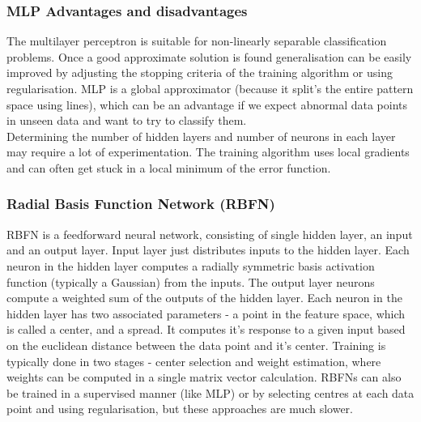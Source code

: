 \documentclass[a4paper, 11pt]{article}
\begin{document}
\subsubsection{MLP Advantages and disadvantages}
The multilayer perceptron is suitable for non-linearly separable classification problems. Once a good approximate solution is found generalisation can be easily improved by adjusting the stopping criteria of the training algorithm or using regularisation. MLP is a global approximator (because it split's the entire pattern space using lines), which can be an advantage if we expect abnormal data points in unseen data and want to try to classify them. \\ 
Determining the number of hidden layers and number of neurons in each layer may require a lot of experimentation. The training algorithm uses local gradients and can often get stuck in a local minimum of the error function. 


\subsubsection{Radial Basis Function Network (RBFN)}
RBFN is a feedforward neural network, consisting of single hidden layer, an input and an output layer. Input layer just distributes inputs to the hidden layer. Each neuron in the hidden layer computes a radially symmetric basis activation function (typically a Gaussian) from the inputs. The output layer neurons compute a weighted sum of the outputs of the hidden layer. Each neuron in the hidden layer has two associated parameters - a point in the feature space, which is called a center, and a spread. It computes it's response to a given input based on the euclidean distance between the data point and it's center. Training is typically done in two stages - center selection and weight estimation, where weights can be computed in a single matrix vector calculation. RBFNs can also be trained in a supervised manner (like MLP) or by selecting centres at each data point and using regularisation, but these approaches are much slower.
\end{document}
